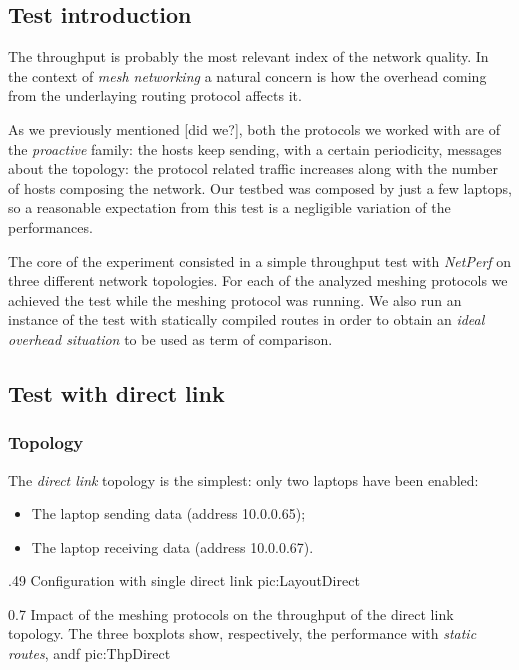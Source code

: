 \subsection{Test introduction}

    The throughput is probably the most relevant index of the network
    quality. In the context of \emph{mesh networking} a natural concern
    is how the overhead coming from the underlaying routing protocol
    affects it.

    As we previously mentioned [did we?], both the protocols we worked
    with are of the \emph{proactive} family: the hosts keep sending,
    with a certain periodicity, messages about the topology: the protocol
    related traffic increases along with the number of hosts composing the
    network.  Our testbed was composed by just a few laptops, so a
    reasonable expectation from this test is a negligible variation of the
    performances.

    The core of the experiment consisted in a simple throughput test with
    \emph{NetPerf} on three different network topologies. For each of the
    analyzed meshing protocols we achieved the test while the meshing
    protocol was running. We also run an instance of the test with
    statically compiled routes in order to obtain an \emph{ideal overhead
    situation} to be used as term of comparison.

\subsection{Test with direct link}

    \subsubsection{Topology}

        The \emph{direct link} topology is the simplest: only two laptops
        have been enabled:
        \begin{itemize}
        \item   The laptop sending data (address 10.0.0.65);
        \item   The laptop receiving data (address 10.0.0.67).
        \end{itemize}

                {.49\columnwidth}
                {Configuration with single direct link}
                {pic:LayoutDirect}

                {0.7 \columnwidth}
                {Impact of the meshing protocols on the throughput of the
                 direct link topology. The three boxplots show,
                 respectively, the performance with \emph{static routes},
                 \emph{\batman} andf \emph{\olsr}}
                {pic:ThpDirect}

